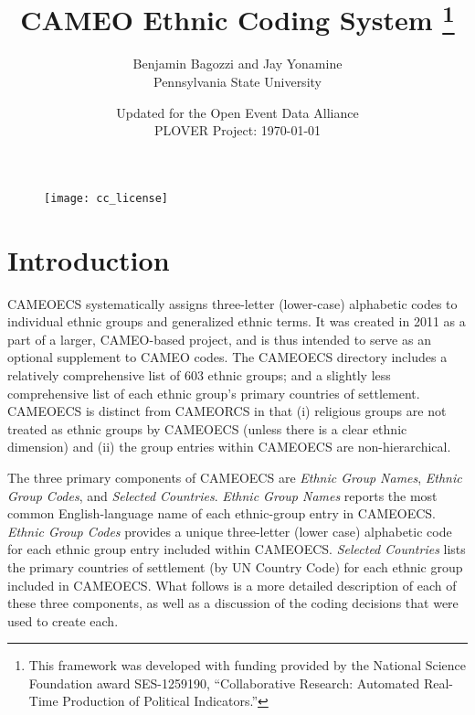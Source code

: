 \documentclass[12pt]{article}
\title{CAMEO Ethnic Coding System
\thanks{ This framework was developed  with funding provided by the National Science Foundation award SES-1259190, ``Collaborative Research: Automated Real-Time Production of Political Indicators.''}}
\author{Benjamin Bagozzi and Jay Yonamine \\Pennsylvania State University}
\date{Updated for the Open Event Data Alliance\\ PLOVER Project: \today}
\begin{document}
\maketitle

\begin{figure}[h!]
\centering
\texttt{[image: cc\_license]}
\end{figure}

\newpage


\section{Introduction}
\label{sect:CAMEOECS}

CAMEOECS systematically assigns three-letter (lower-case) alphabetic codes to individual ethnic groups and generalized ethnic terms. It was created in 2011 as a part of a larger, CAMEO-based project, and is thus intended to serve as an optional supplement to CAMEO codes. The CAMEOECS directory includes a relatively comprehensive list of 603 ethnic groups; and a slightly less comprehensive list of each ethnic group's primary countries of settlement.  CAMEOECS is distinct from CAMEORCS in that (i) religious groups are not treated as ethnic groups by CAMEOECS (unless there is a clear ethnic dimension) and (ii) the group entries within CAMEOECS are non-hierarchical.

The three primary components of CAMEOECS are \textit{Ethnic Group Names}, \textit{Ethnic Group Codes}, and \textit{Selected Countries}.  \textit{Ethnic Group Names} reports the most common English-language name of each ethnic-group entry in CAMEOECS.  \textit{Ethnic Group Codes} provides a unique three-letter (lower case) alphabetic code for each ethnic group entry included within CAMEOECS.  \textit{Selected Countries} lists the primary countries of settlement (by UN Country Code) for each ethnic group included in CAMEOECS.  What follows is a more detailed description of each of these three components, as well as a discussion of the coding decisions that were used to create each.
\end{document}
